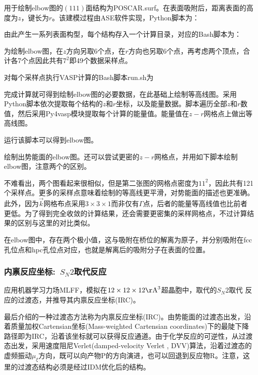 用于绘制\textrm{elbow}图的$(111)$面结构为\textrm{POSCAR.surf}。在表面吸附后，距离表面的高度为$z$，键长为$r$。该建模过程由\textrm{ASE}软件实现，\textrm{Python}脚本为：

由此产生一系列表面构型，每个结构存入一个计算目录，对应的\textrm{Bash}脚本为：

为绘制\textrm{elbow}图，在$z$方向另取6个点，在$r$方向也另取6个点，再考虑两个顶点，合计各7个点因此共有$7^2$即49个数据采样点。

对每个采样点执行\textrm{VASP}计算的\textrm{Bash}脚本\textrm{run.sh}为


完成计算就可得到绘制\textrm{elbow}图的必要数据，在此基础上绘制等高线图。采用\textrm{Python}脚本依次提取每个结构的$z$和$r$坐标，以及能量数据。脚本遍历全部$z$和$r$数值，然后采用\textrm{Py4vasp}模块提取每个计算的能量值。能量值在$z-r$网格点上做出等高线图。

运行该脚本可以得到\textrm{elbow}图。

绘制出势能面的\textrm{elbow}图。还可以尝试更密的$z-r$网格点，并用如下脚本绘制\textrm{elbow}图，注意两个的区别。

不难看出，两个图看起来很相似，但是第二张图的网格点密度为$11^2$，因此共有121个采样点。更多的采样点意味着绘制的等高线更平滑，对势能面的描述也更准确。此外，因为$\vec k$网格布点采用$3\times3\times1$而非仅有$\Gamma$点，后者的能量等高线值也比前者更低。为了得到完全收敛的计算结果，还会需要更密集的采样网格点，不过计算结果的区别与这里的对比类似。

在\textrm{elbow}图中，存在两个极小值，这与吸附在桥位的解离为原子，并分别吸附在\textrm{fcc}孔位点和\textrm{hpc}孔位点对应，也就是解离后的吸附分子在表面的位置。

\subsubsection{内禀反应坐标:~$S_N2$取代反应}
应用机器学习力场\textrm{MLFF}，模拟在$12\times12\times12\mathrm{\AA}^3$超晶胞中，取代的$S_N2$取代 反应的过渡态，并推导其内禀反应坐标\textrm{(IRC)}。

最后介绍的一种过渡态方法称为内禀反应坐标\textrm{(IRC)}。由势能面的过渡态出发，沿着质量加权\textrm{Cartensian}坐标\textrm{(Mass-weighted Cartensian coordinates)}下的最陡下降路径即为\textrm{IRC}，沿着该坐标就可以获得反应通道。由于化学反应的可逆性，从过渡态出发，采用速度阻尼\textrm{Verlet}\textrm{(damped-velocity Verlet , DVV)}算法，沿着过渡态的虚频振动$\mu_{\xi}$方向，既可以向产物\textrm{P}的方向演进，也可以回退到反应物\textrm{R}。注意，这里的过渡态结构必须是经过\textrm{IDM}优化后的结构。

